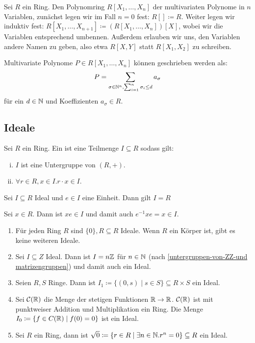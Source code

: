 \begin{definition}
  Sei \(R\) ein Ring.
  Den Polynomring \(R[X_1,\dots,X_n]\) der multivariaten Polynome in \(n\) Variablen, zunächst legen wir im Fall \(n=0\) fest: \(R[]\coloneq R\). Weiter legen wir induktiv fest: \(R[X_1,\dots,X_{n+1}]\coloneq (R[X_1,\dots,X_n])[X]\), wobei wir die Variablen entsprechend umbennen. Außerdem erlauben wir uns, den Variablen andere Namen zu geben, also etwa \(R[X,Y]\) statt \(R[X_1,X_2]\) zu schreiben.
\end{definition}

\begin{bemerkung}
  Multivariate Polynome \(P\in R[X_1,\dots,X_n]\) können geschrieben werden als:
  \[
    P=\sum_{\sigma\in \mathbb{N}^n,\sum_{i=1}^n \sigma_i\leq d}a_{\sigma}
    \]
    für ein \(d\in \mathbb{N}\) und Koeffizienten \(a_\sigma\in R\).
\end{bemerkung}

\subsection{Ideale}
\begin{definition}
  Sei \(R\) ein Ring.
  Ein  ist eine Teilmenge \(I\subseteq R\) sodass gilt:
  \begin{enumerate}[(i)]
  \item \(I\) ist eine Untergruppe von \((R,+)\).
  \item \(\forall r\in R, x\in I. r\cdot x\in I\).
  \end{enumerate}
\end{definition}

\begin{lemma}
  Sei \(I\subseteq R\) Ideal und \(e\in I\) eine Einheit. Dann gilt \(I=R\)
\end{lemma}

\begin{beweis}
  Sei \(x\in R\). Dann ist \(xe\in I\) und damit auch \(e^{-1}xe=x\in I\).
\end{beweis}

\begin{beispiel}
  \begin{enumerate}
    \label{beispiel-ideale-Z}
  \item Für jeden Ring \(R\) sind \(\{0\},R\subseteq R\) Ideale.
    Wenn \(R\) ein Körper ist, gibt es keine weiteren Ideale.
  \item Sei \(I\subseteq Z\) Ideal. Dann ist \(I=n\mathbb{Z}\) für \(n\in \mathbb{N}\) (nach \ref{untergruppen-von-ZZ-und matrizengruppen}) und damit auch ein Ideal. 
  \item Seien \(R,S\) Ringe. Dann ist \(I_1\coloneq \{(0,s)\mid s\in S\}\subseteq R\times S\) ein Ideal.
  \item Sei \(\mathcal C(\mathbb{R})\) die Menge der stetigen Funktionen \(\mathbb{R}\to \mathbb{R}\).
    \(\mathcal C(\mathbb{R})\) ist mit punktweiser Addition und Multiplikation ein Ring.
    Die Menge \(I_0\coloneq \{f\in C(\mathbb{R})\mid f(0)=0\}\) ist ein Ideal.
  \item Sei \(R\) ein Ring, dann ist \(\sqrt{0}\coloneq \{r\in R\mid \exists n\in\mathbb{N}. r^n=0\}\subseteq R\) ein Ideal.
  \end{enumerate}
\end{beispiel}

